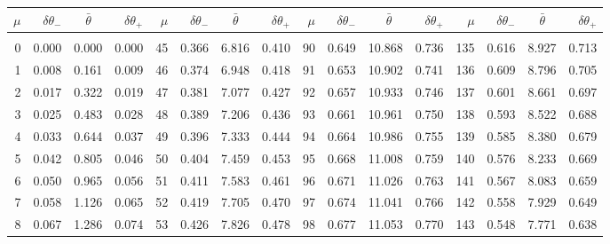 \newpage
\begin{table}\centering
\small{ \begin{tabular}{rrrr|rrrr|rrrr|rrrr}
$\mu$ & $\delta\theta_-$  & $\bar{\theta}~~~~$ & $\delta\theta_+$ &
$\mu$ & $\delta\theta_-$  & $\bar{\theta}~~~~$ & $\delta\theta_+$ &
$\mu$ & $\delta\theta_-$  & $\bar{\theta}~~~~$ & $\delta\theta_+$ &
$\mu$ & $\delta\theta_-$  & $\bar{\theta}~~~~$ & $\delta\theta_+$ \\\hline
&&&&&&&&&&&&&&&\\[-1.75ex]
  0 & \tiny{  0.000} &   0.000 & \tiny{  0.000} &  45 & \tiny{  0.366} &   6.816 & \tiny{  0.410} &  90 & \tiny{  0.649} &  10.868 & \tiny{  0.736} & 135 & \tiny{  0.616} &   8.927 & \tiny{  0.713}\\
  1 & \tiny{  0.008} &   0.161 & \tiny{  0.009} &  46 & \tiny{  0.374} &   6.948 & \tiny{  0.418} &  91 & \tiny{  0.653} &  10.902 & \tiny{  0.741} & 136 & \tiny{  0.609} &   8.796 & \tiny{  0.705}\\
  2 & \tiny{  0.017} &   0.322 & \tiny{  0.019} &  47 & \tiny{  0.381} &   7.077 & \tiny{  0.427} &  92 & \tiny{  0.657} &  10.933 & \tiny{  0.746} & 137 & \tiny{  0.601} &   8.661 & \tiny{  0.697}\\
  3 & \tiny{  0.025} &   0.483 & \tiny{  0.028} &  48 & \tiny{  0.389} &   7.206 & \tiny{  0.436} &  93 & \tiny{  0.661} &  10.961 & \tiny{  0.750} & 138 & \tiny{  0.593} &   8.522 & \tiny{  0.688}\\
  4 & \tiny{  0.033} &   0.644 & \tiny{  0.037} &  49 & \tiny{  0.396} &   7.333 & \tiny{  0.444} &  94 & \tiny{  0.664} &  10.986 & \tiny{  0.755} & 139 & \tiny{  0.585} &   8.380 & \tiny{  0.679}\\
  5 & \tiny{  0.042} &   0.805 & \tiny{  0.046} &  50 & \tiny{  0.404} &   7.459 & \tiny{  0.453} &  95 & \tiny{  0.668} &  11.008 & \tiny{  0.759} & 140 & \tiny{  0.576} &   8.233 & \tiny{  0.669}\\
  6 & \tiny{  0.050} &   0.965 & \tiny{  0.056} &  51 & \tiny{  0.411} &   7.583 & \tiny{  0.461} &  96 & \tiny{  0.671} &  11.026 & \tiny{  0.763} & 141 & \tiny{  0.567} &   8.083 & \tiny{  0.659}\\
  7 & \tiny{  0.058} &   1.126 & \tiny{  0.065} &  52 & \tiny{  0.419} &   7.705 & \tiny{  0.470} &  97 & \tiny{  0.674} &  11.041 & \tiny{  0.766} & 142 & \tiny{  0.558} &   7.929 & \tiny{  0.649}\\
  8 & \tiny{  0.067} &   1.286 & \tiny{  0.074} &  53 & \tiny{  0.426} &   7.826 & \tiny{  0.478} &  98 & \tiny{  0.677} &  11.053 & \tiny{  0.770} & 143 & \tiny{  0.548} &   7.771 & \tiny{  0.638}\\

\end{tabular}}
\end{table}
